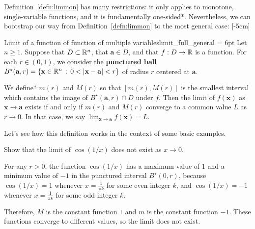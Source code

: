 \documentclass{watsonbook}
\begin{document}
Definition~\ref{defn:limmon} has many restrictions: it only applies to
monotone, single-variable functions, and it is fundamentally
one-sided*. Nevertheless, we can bootstrap our way from
Definition~\ref{defn:limmon} to the most general case: [-5cm]

\begin{defn}{Limit of a function of function of multiple
    variables}{limit_full_general} \parskip = 6pt Let $n \geq 1$. Suppose that
  $D \subset \mathbb{R}^n$, that $\mathbf{a} \in D$, and that $f:D \to
  \mathbb{R}$ is a function. For each $r \in (0,1)$, we consider the \textbf{punctured ball}
  $B^\star(\mathbf{a},r) = \{\mathbf{x} \in \mathbb{R}^n \,: \, 0 <
  \left|\mathbf{x} - \mathbf{a}\right| < r \}$ of radius $r$ centered
  at $\mathbf{a}$.

  We define* $m(r)$ and $M(r)$ so that $[m(r),M(r)]$ is the smallest
  interval which contains the image of $B^\star(\mathbf{a},r) \cap D$ under
  $f$. Then the limit of $f(\mathbf{x})$ as
  $\mathbf{x} \to \mathbf{a}$ exists if and only if $m(r)$ and $M(r)$
  converge to a common value $L$ as $r \to 0$. In that case, we say
  $\displaystyle{\lim_{\mathbf{x} \to \mathbf{a}} f(\mathbf{x}) = L}$. 
\end{defn}

Let's see how this definition works in the context of some basic
examples. 

\begin{example}{}{}
  Show that the limit of $\cos (1/x)$ does not exist as $x\to0$. 
\end{example}

\begin{solution}
  For any $r>0$, the function $\cos(1/x)$ has a maximum value of $1$
  and a minimum value of $-1$ in the punctured interval
  $B^\star(0,r)$, because $\cos(1/x) = 1$ whenever $x = \tfrac{1}{\pi
    k}$ for some even integer $k$, and $\cos(1/x) = -1$ whenever $x=
  \tfrac{1}{\pi k}$ for some odd integer $k$.
  
  Therefore, $M$ is the constant function $1$ and $m$
  is the constant function $-1$. These functions converge to different
  values, so the limit does not exist. 
\end{solution}
\end{document}
